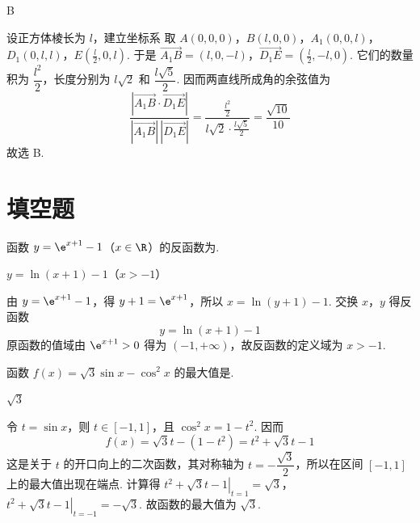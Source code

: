 \begin{answer}
B
\end{answer}

\begin{solution}
设正方体棱长为 \(l\)，建立坐标系
取 \(A(0,0,0)\)，\(B(l,0,0)\)，\(A_1(0,0,l)\)，\(D_1(0,l,l)\)，\(E\left(\frac l2,0,l\right)\).
于是 \(\overrightarrow{A_1B}=(l,0,-l)\)，\(\overrightarrow{D_1E}=\left(\frac l2,-l,0\right)\).
它们的数量积为 \(\dfrac{l^2}{2}\)，长度分别为 \(l\sqrt2\) 和 \(\dfrac{l\sqrt5}{2}\). 因而两直线所成角的余弦值为
\[
\frac{\left|\overrightarrow{A_1B}\cdot\overrightarrow{D_1E}\right|}{|\overrightarrow{A_1B}|\,|\overrightarrow{D_1E}|}=\frac{\frac{l^2}{2}}{l\sqrt2\cdot\frac{l\sqrt5}{2}}=\frac{\sqrt{10}}{10}
\]
故选 B.
\end{solution}

\section{填空题}

\begin{problem}
函数 \( y = \e^{x+1} - 1 \)（\( x \in \R \)）的反函数为\fillinblank{}.
\end{problem}

\begin{answer}
\( y=\ln(x+1)-1 \)（\(x>-1\)）
\end{answer}

\begin{solution}
由 \(y=\e^{x+1}-1\)，得 \(y+1=\e^{x+1}\)，所以 \(x=\ln(y+1)-1\). 交换 \(x\)，\(y\) 得反函数
\[
y=\ln(x+1)-1
\]
原函数的值域由 \(\e^{x+1}>0\) 得为 \((-1,+\infty)\)，故反函数的定义域为 \(x>-1\).
\end{solution}

\begin{problem}
函数 \( f(x)=\sqrt{3}\sin x-\cos^{2}x \) 的最大值是\fillinblank{}.
\end{problem}

\begin{answer}
\( \sqrt{3} \)
\end{answer}

\begin{solution}
令 \(t=\sin x\)，则 \(t\in[-1,1]\)，且 \(\cos^2x=1-t^2\). 因而
\[
f(x)=\sqrt3t-(1-t^2)=t^2+\sqrt3t-1
\]
这是关于 \(t\) 的开口向上的二次函数，其对称轴为 \(t=-\dfrac{\sqrt3}{2}\)，所以在区间 \([-1,1]\) 上的最大值出现在端点. 计算得
\(\left.t^2+\sqrt3t-1\right|_{t=1}=\sqrt3\)，\(\left.t^2+\sqrt3t-1\right|_{t=-1}=-\sqrt3\).
故函数的最大值为 \(\sqrt3\).
\end{solution}

